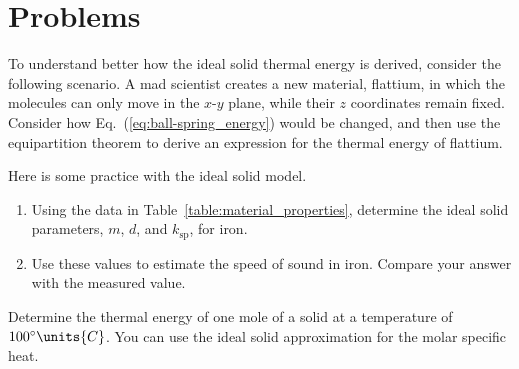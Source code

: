\newpage

\section*{Problems}

\begin{problem}
  To understand better how the ideal solid thermal energy
  is derived, consider the following scenario.
  A mad scientist creates a new material, flattium, in which the
  molecules can only move in the $x$-$y$ plane, while their $z$
  coordinates remain fixed.  Consider how
  Eq.~(\ref{eq:ball-spring_energy}) would be changed, and then use
  the equipartition theorem to derive an expression for the thermal energy of
  flattium.
\label{problem:flattium}
\end{problem}

\begin{problem}
  Here is some practice with the ideal solid model.
\begin{enumerate}
\item Using the data in Table~\ref{table:material_properties},
  determine the ideal solid parameters, $m$, $d$, and $k_\text{sp}$,
  for iron.
\item Use these values to estimate the speed of sound in iron.
  Compare your answer with the measured value.
\end{enumerate}
\label{problem:ball-spring_iron}
\end{problem}

\begin{problem}
  Determine the thermal energy of one mole of a solid at a temperature of
  $100^\circ\units{C}$.  You can use the ideal solid
  approximation for the molar specific heat.
  \label{problem:iron_E_thermal}
\end{problem}




